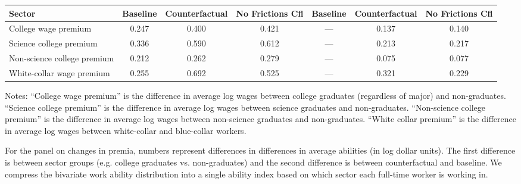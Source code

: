 \begin{table}
{{\begin{threeparttable}
\begin{tabular}{lcccccc}
Sector & Baseline & Counterfactual & No Frictions Cfl & Baseline & Counterfactual & No Frictions Cfl \\ 
\midrule 
College wage premium & 0.247 & 0.400 & 0.421 & --- & 0.137 & 0.140 \\ 
Science college premium & 0.336 & 0.590 & 0.612 & --- & 0.213 & 0.217 \\ 
Non-science college premium & 0.212 & 0.262 & 0.279 & --- & 0.075 & 0.077 \\ 
White-collar wage premium & 0.255 & 0.692 & 0.525 & --- & 0.321 & 0.229 \\ 
\bottomrule 
\end{tabular} 
\footnotesize Notes: ``College wage premium'' is the difference in average log wages between college graduates (regardless of major) and non-graduates. ``Science college premium''  is the difference in average log wages between science graduates and non-graduates. ``Non-science college premium''  is the difference in average log wages between non-science graduates and non-graduates. ``White collar premium''  is the difference in average log wages between white-collar and blue-collar workers. 
 
\medskip{} 
 
For the panel on changes in premia, numbers represent differences in differences in average abilities (in log dollar units). The first difference is between sector groups (e.g. college graduates vs. non-graduates) and the second difference is between counterfactual and baseline. We compress the bivariate work ability distribution into a single ability index based on which sector each full-time worker is working in. 
\end{threeparttable} 
} 
} 
\end{table} 
